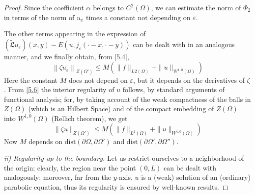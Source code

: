 \documentclass[a4paper,12pt,leqno]{article}
\numberwithin{equation}{section}
\begin{document}
\begin{proof}
Since the coefficient $\alpha$ belongs to $C^{2}(\Omega)$, we can estimate the norm of $\Phi_{2}$ in terms of the norm of $u_{x}$ times a constant not depending on $\varepsilon$.

The other terms appearing in the expression of $(\tilde{\mathfrak{L}} u_{\varepsilon})(x, y)-E(u, j_{\varepsilon}(\cdot-x,\cdot-y))$ can be dealt with in an analogous manner, and we finally obtain, from \eqref{5.4},
\begin{equation} \label{5.6}
	\left\|\zeta u_{\varepsilon}\right\|_{Z\left(\Omega'\right)} \leqslant M\left(\|f\|_{L2(\Omega)}+\|u\|_{W^{1,0}(\Omega)}\right)
\end{equation}
Here the constant $M$ does not depend on $\varepsilon$, but it depends on the derivatives of $\zeta$. From \eqref{5.6} the interior regularity of $u$ follows,
by standard arguments of functional analysis; for, by taking account of the weak compactness of the balls in $Z(\Omega)$ (which is an Hilbert Space) and of the compact embedding of $Z(\Omega)$ into $W^{1,0}(\Omega)$ (Rellich theorem), we get
\begin{equation} \label{5.7}
	\|\zeta u\|_{Z\left(\Omega'\right)} \leqslant M\left(\|f\|_{L^{2}(\Omega)}+\|u\|_{W^{1,0}(\Omega)}\right)
\end{equation}
Now $M$ depends on $\textrm{dist} \left(\partial \Omega, \partial \Omega'\right)$ and $\textrm{dist} \left(\partial \Omega', \partial \Omega''\right)$.

\newpage

\emph{ii) Regularity up to the boundary.}
Let us restrict ourselves to a neighborhood of the origin; clearly, the region near the point $(0, L)$ can be dealt with analogously; moreover, far from the $y$-axis, $u$ is a (weak) solution of an (ordinary) parabolic equation, thus its regularity is ensured by well-known results.


\end{proof}
\end{document}
